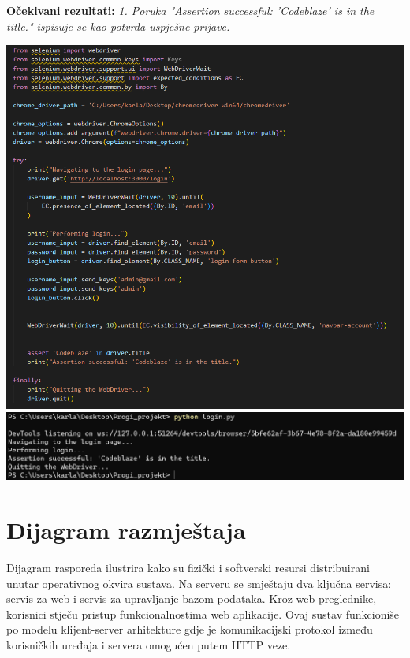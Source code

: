                                                                         \textbf{Očekivani rezultati:}
                                                                        \textit{1. Poruka "Assertion successful: 'Codeblaze' is in the title." ispisuje se kao potvrda uspješne prijave.}

                                    \includegraphics[width=1\linewidth]{slike/LoginSelenium.png}
                                    \includegraphics[width=1\linewidth]{slike/LoginSeleniumOutput.png}




			
			\eject 
		
		
		\section{Dijagram razmještaja}
			
			Dijagram rasporeda ilustrira kako su fizički i softverski resursi distribuirani unutar operativnog okvira sustava. Na serveru se smještaju dva ključna servisa: servis za web i servis za upravljanje bazom podataka. Kroz web preglednike, korisnici stječu pristup funkcionalnostima web aplikacije. Ovaj sustav funkcioniše po modelu klijent-server arhitekture gdje je komunikacijski protokol između korisničkih uređaja i servera omogućen putem HTTP veze.

